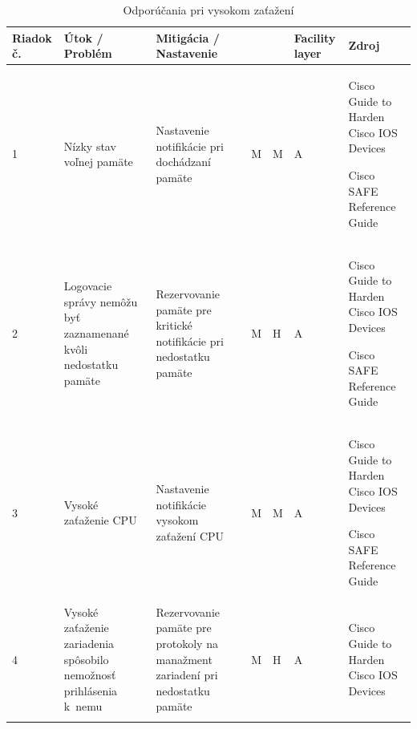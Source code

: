 \begin{longtable}[!htbp]{|C{2.5em}L{9em}L{9em}C{2em}C{2.5em}C{7.5em}L{10em}|}
	
	\hline
	\centering
	
	Riadok č.	&Útok / Problém	&Mitigácia / Nastavenie	& 	&	&Facility layer	&Zdroj\\
	\endhead
	
	 1	&Nízky stav voľnej pamäte	&Nastavenie notifikácie pri dochádzaní pamäte	&M	&M	&A	&Cisco Guide to Harden Cisco IOS Devices \cite{Singh2018}
	
	Cisco SAFE Reference Guide \cite{uYLsMtQInofenpV3}\\
	2	&Logovacie správy nemôžu byť zaznamenané kvôli nedostatku pamäte	&Rezervovanie pamäte pre kritické notifikácie pri nedostatku pamäte	&M	&H	&A	&Cisco Guide to Harden Cisco IOS Devices \cite{Singh2018}
	
	Cisco SAFE Reference Guide \cite{uYLsMtQInofenpV3}\\
	 3	&Vysoké zaťaženie CPU	&Nastavenie notifikácie vysokom zaťažení CPU	&M	&M	&A	&Cisco Guide to Harden Cisco IOS Devices \cite{Singh2018}
	
	Cisco SAFE Reference Guide \cite{uYLsMtQInofenpV3}\\
	4	&Vysoké zaťaženie zariadenia spôsobilo nemožnosť prihlásenia k~nemu	&Rezervovanie pamäte pre protokoly na manažment zariadení pri nedostatku pamäte	&M	&H	&A	&Cisco Guide to Harden Cisco IOS Devices \cite{Singh2018}\\
	
	
	\hline
	\caption{Odporúčania pri vysokom zaťažení}
	\label{tab:highload}%
\end{longtable}%

